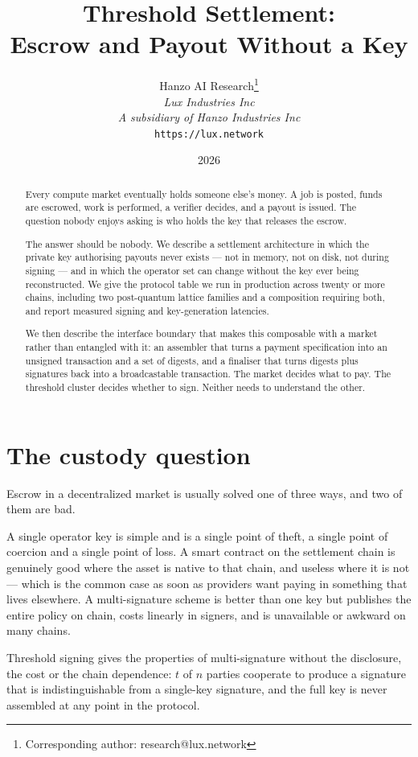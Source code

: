 \documentclass[11pt,a4paper]{article}
\title{Threshold Settlement:\\Escrow and Payout Without a Key}
\author{
Hanzo AI Research\thanks{Corresponding author: research@lux.network} \\
\textit{Lux Industries Inc} \\
\textit{A subsidiary of Hanzo Industries Inc} \\
\texttt{https://lux.network}
}
\date{2026}
\begin{document}
\hanzocoverpage

\begin{abstract}
Every compute market eventually holds someone else's money. A job is posted,
funds are escrowed, work is performed, a verifier decides, and a payout is
issued. The question nobody enjoys asking is who holds the key that releases the
escrow.

The answer should be nobody. We describe a settlement architecture in which the
private key authorising payouts never exists --- not in memory, not on disk, not
during signing --- and in which the operator set can change without the key ever
being reconstructed. We give the protocol table we run in production across
twenty or more chains, including two post-quantum lattice families and a
composition requiring both, and report measured signing and key-generation
latencies.

We then describe the interface boundary that makes this composable with a market
rather than entangled with it: an assembler that turns a payment specification
into an unsigned transaction and a set of digests, and a finaliser that turns
digests plus signatures back into a broadcastable transaction. The market decides
what to pay. The threshold cluster decides whether to sign. Neither needs to
understand the other.
\end{abstract}

\tableofcontents
\newpage

\section{The custody question}

Escrow in a decentralized market is usually solved one of three ways, and two of
them are bad.

A single operator key is simple and is a single point of theft, a single point
of coercion and a single point of loss. A smart contract on the settlement chain
is genuinely good where the asset is native to that chain, and useless where it
is not --- which is the common case as soon as providers want paying in something
that lives elsewhere. A multi-signature scheme is better than one key but
publishes the entire policy on chain, costs linearly in signers, and is
unavailable or awkward on many chains.

Threshold signing gives the properties of multi-signature without the
disclosure, the cost or the chain dependence: $t$ of $n$ parties cooperate to
produce a signature that is indistinguishable from a single-key signature, and
the full key is never assembled at any point in the protocol.
\end{document}
